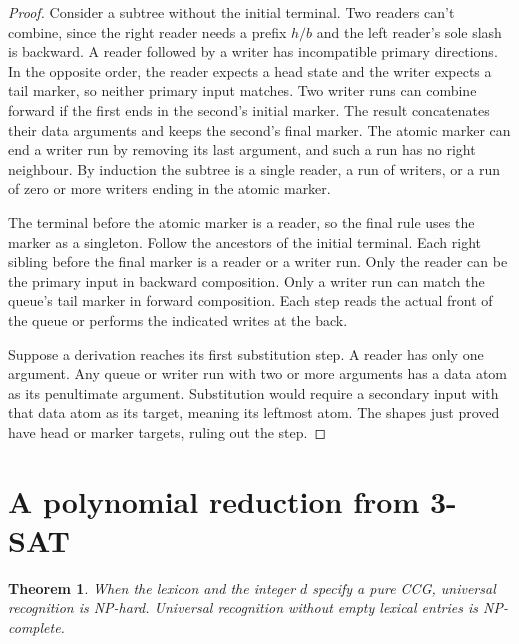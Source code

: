 \documentclass[11pt]{article}
\newtheorem{theorem}{Theorem}
\begin{document}
\begin{proof}
Consider a subtree without the initial terminal. Two readers can't combine, since the right reader needs a prefix \(h/b\) and the left reader's sole slash is backward. A reader followed by a writer has incompatible primary directions. In the opposite order, the reader expects a head state and the writer expects a tail marker, so neither primary input matches. Two writer runs can combine forward if the first ends in the second's initial marker. The result concatenates their data arguments and keeps the second's final marker. The atomic marker can end a writer run by removing its last argument, and such a run has no right neighbour. By induction the subtree is a single reader, a run of writers, or a run of zero or more writers ending in the atomic marker.

The terminal before the atomic marker is a reader, so the final rule uses the marker as a singleton. Follow the ancestors of the initial terminal. Each right sibling before the final marker is a reader or a writer run. Only the reader can be the primary input in backward composition. Only a writer run can match the queue's tail marker in forward composition. Each step reads the actual front of the queue or performs the indicated writes at the back.

Suppose a derivation reaches its first substitution step. A reader has only one argument. Any queue or writer run with two or more arguments has a data atom as its penultimate argument. Substitution would require a secondary input with that data atom as its target, meaning its leftmost atom. The shapes just proved have head or marker targets, ruling out the step.
\end{proof}

\section{A polynomial reduction from 3-SAT}

\begin{theorem}
When the lexicon and the integer \(d\) specify a pure CCG, universal recognition is NP-hard. Universal recognition without empty lexical entries is NP-complete.
\end{theorem}
\end{document}
